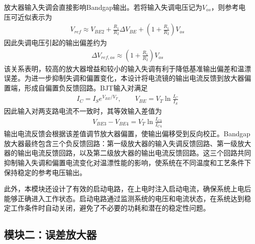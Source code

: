 \documentclass[a4paper, 12pt]{article}
\begin{document}
放大器输入失调会直接影响Bandgap输出。若将输入失调电压记为$V_{os}$，则参考电压可近似表示为
\begin{gather}
  V_{ref}
  \approx
  V_{BE2}
  +\frac{R_1}{R_2}\Delta V_{BE}
  +\left(1+\frac{R_1}{R_2}\right)V_{os}
\end{gather}
因此失调电压引起的输出偏差约为
\begin{gather}
  \Delta V_{ref,os}
  \approx
  \left(1+\frac{R_1}{R_2}\right)V_{os}
\end{gather}
该关系表明，较高的放大器增益和较小的输入失调有利于降低基准输出偏差和温漂误差。为进一步抑制失调和偏置变化，本设计将电流镜的输出电流反馈到放大器偏置端，形成自偏置负反馈回路。BJT输入对满足
\begin{gather}
  I_C=I_S e^{V_{BE}/V_T}, \qquad
  V_{BE}=V_T\ln\frac{I_C}{I_S}
\end{gather}
因此输入对两支路电流不一致时，其等效输入差值为
\begin{gather}
  V_{BE3}-V_{BE4}
  =
  V_T\ln\frac{I_{C3}}{I_{C4}}
\end{gather}
输出电流反馈会根据该差值调节放大器偏置，使输出偏移受到反向校正。Bandgap放大器最终包含三个负反馈回路：第一级放大器的输入失调反馈回路、第一级放大器的输出电流反馈回路，以及第二级放大器的输出电流反馈回路。这三个回路共同抑制输入失调和偏置电流变化对温漂性能的影响，使系统在不同温度和工艺条件下保持稳定的参考电压输出。

此外，本模块还设计了有效的启动电路，在上电时注入启动电流，确保系统上电后能够正确进入工作状态。启动电路通过监测系统的电压和电流状态，在系统达到稳定工作条件时自动关闭，避免了不必要的功耗和潜在的稳定性问题。


\subsection{模块二：误差放大器}
\end{document}
